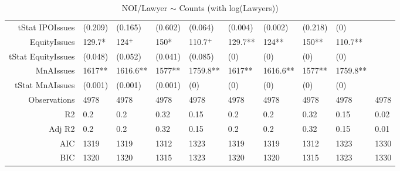 \begin{table}[ht]
\begin{tabular}{rlllllllll}
  tStat IPOIssues & (0.209) & (0.165) & (0.602) & (0.064) & (0.004) & (0.002) & (0.218) & (0) &  \\ 
  EquityIssues & 129.7* & 124$^{+}$ & 150* & 110.7$^{+}$ & 129.7** & 124** & 150** & 110.7** &  \\ 
  tStat EquityIssues & (0.048) & (0.052) & (0.041) & (0.085) & (0) & (0) & (0) & (0) &  \\ 
  MnAIssues & 1617** & 1616.6** & 1577** & 1759.8** & 1617** & 1616.6** & 1577** & 1759.8** &  \\ 
  tStat MnAIssues & (0.001) & (0.001) & (0.001) & (0) & (0) & (0) & (0) & (0) &  \\ 
  Observations & 4978 & 4978 & 4978 & 4978 & 4978 & 4978 & 4978 & 4978 & 4978 \\ 
  R2 & 0.2 & 0.2 & 0.32 & 0.15 & 0.2 & 0.2 & 0.32 & 0.15 & 0.02 \\ 
  Adj R2 & 0.2 & 0.2 & 0.32 & 0.15 & 0.2 & 0.2 & 0.32 & 0.15 & 0.01 \\ 
  AIC & 1319 & 1319 & 1312 & 1323 & 1319 & 1319 & 1312 & 1323 & 1330 \\ 
  BIC & 1320 & 1320 & 1315 & 1323 & 1320 & 1320 & 1315 & 1323 & 1330 \\ 
   \hline
\end{tabular}
\caption{NOI/Lawyer $\sim$ Counts (with log(Lawyers))} 
\end{table}
